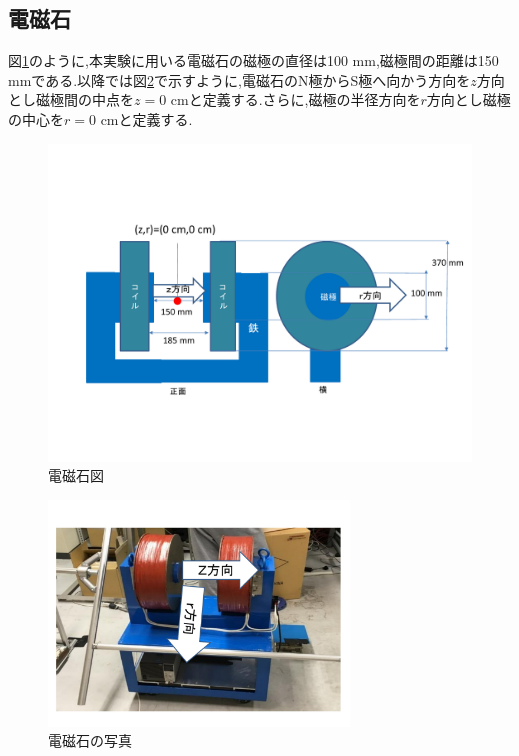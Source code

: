 \subsection{電磁石}
図\ref{magfigure}のように,本実験に用いる電磁石の磁極の直径は100 mm,磁極間の距離は150 mmである.以降では図\ref{magphoto}で示すように,電磁石のN極からS極へ向かう方向を$z$方向とし磁極間の中点を$z=0$ cmと定義する.さらに,磁極の半径方向を$r$方向とし磁極の中心を$r=0$ cmと定義する.

\begin{figure}[tbp]
	\centering
	\includegraphics[width=13cm]{fig/iguchi/magnetfigure.pdf}
	\caption{電磁石図}
	\label{magfigure}
\end{figure}

\begin{figure}[tbp]
	\centering
	\includegraphics[width=8cm]{fig/iguchi/magnetphoto.pdf}
	\caption{電磁石の写真}
	\label{magphoto}
\end{figure}

